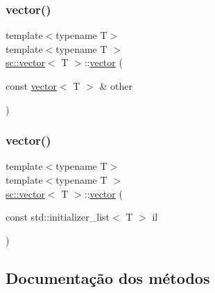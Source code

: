 \mbox{\label{classsc_1_1vector_a6954f3fbe0bce1016e72da109a33ac27}} 
\subsubsection{\texorpdfstring{vector()}{vector()}\hspace{0.1cm}{\footnotesize\ttfamily [10/11]}}
{\footnotesize\ttfamily template$<$typename T$>$ \\
template$<$typename T $>$ \\
\mbox{\hyperlink{classsc_1_1vector}{sc\+::vector}}$<$ T $>$\+::\mbox{\hyperlink{classsc_1_1vector}{vector}} (\begin{DoxyParamCaption}\item[{const \mbox{\hyperlink{classsc_1_1vector}{vector}}$<$ T $>$ \&}]{other }\end{DoxyParamCaption})}

\mbox{\label{classsc_1_1vector_a70d31da6728917d2a55f3c280351703e}} 
\subsubsection{\texorpdfstring{vector()}{vector()}\hspace{0.1cm}{\footnotesize\ttfamily [11/11]}}
{\footnotesize\ttfamily template$<$typename T$>$ \\
template$<$typename T $>$ \\
\mbox{\hyperlink{classsc_1_1vector}{sc\+::vector}}$<$ T $>$\+::\mbox{\hyperlink{classsc_1_1vector}{vector}} (\begin{DoxyParamCaption}\item[{const std\+::initializer\+\_\+list$<$ T $>$}]{il }\end{DoxyParamCaption})}



\subsection{Documentação dos métodos}
\mbox{\label{classsc_1_1vector_aaa1279dfc147a016a70a65faa7d89c23}} 
